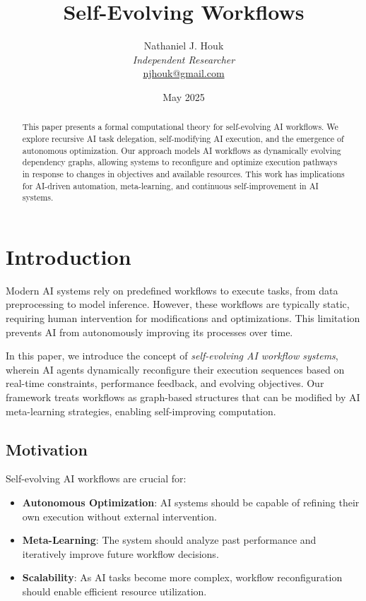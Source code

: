 \documentclass{article}
\title{Self-Evolving Workflows}
\author{Nathaniel J. Houk\\
\textit{Independent Researcher}\\
\href{mailto:njhouk@gmail.com}{njhouk@gmail.com}}
\date{May 2025}
\begin{document}
\maketitle
\tableofcontents

\begin{abstract}
This paper presents a formal computational theory for self-evolving AI workflows. We explore recursive AI task delegation, self-modifying AI execution, and the emergence of autonomous optimization. Our approach models AI workflows as dynamically evolving dependency graphs, allowing systems to reconfigure and optimize execution pathways in response to changes in objectives and available resources. This work has implications for AI-driven automation, meta-learning, and continuous self-improvement in AI systems.
\end{abstract}

\section{Introduction}

Modern AI systems rely on predefined workflows to execute tasks, from data preprocessing to model inference. However, these workflows are typically static, requiring human intervention for modifications and optimizations. This limitation prevents AI from autonomously improving its processes over time.

In this paper, we introduce the concept of \emph{self-evolving AI workflow systems}, wherein AI agents dynamically reconfigure their execution sequences based on real-time constraints, performance feedback, and evolving objectives. Our framework treats workflows as graph-based structures that can be modified by AI meta-learning strategies, enabling self-improving computation.

\subsection{Motivation}

Self-evolving AI workflows are crucial for:
\begin{itemize}
    \item \textbf{Autonomous Optimization}: AI systems should be capable of refining their own execution without external intervention.
    \item \textbf{Meta-Learning}: The system should analyze past performance and iteratively improve future workflow decisions.
    \item \textbf{Scalability}: As AI tasks become more complex, workflow reconfiguration should enable efficient resource utilization.
\end{itemize}
\end{document}
